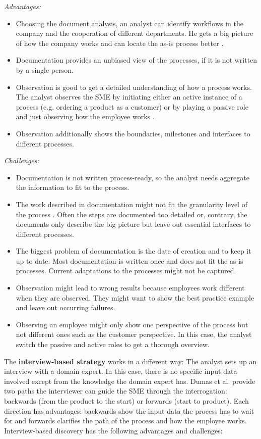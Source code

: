 \textit{Advantages:}
\begin{itemize}
\item Choosing the document analysis, an analyst can identify workflows in the company and the cooperation of different departments. He gets a big picture of how the company works and can locate the as-is process better \cite{Dumas2013}. 
\item Documentation provides an unbiased view of the processes, if it is not written by a single person. 
\item Observation is good to get a detailed understanding of how a process works. The analyst observes the SME by initiating either an active instance of a process (e.g. ordering a product as a customer) or by playing a passive role and just observing how the employee works \cite{Dumas2013}. 
\item Observation additionally shows the boundaries, milestones and interfaces to different processes.
\end{itemize}

\textit{Challenges:}
\begin{itemize}
\item Documentation is not written process-ready, so the analyst needs aggregate the information to fit to the process. 
\item The work described in documentation might not fit the granularity level of the process \cite{Dumas2013}. Often the steps are documented too detailed or, contrary, the documents only describe the big picture but leave out essential interfaces to different processes. 
\item The biggest problem of documentation is the date of creation and to keep it up to date: Most documentation is written once and does not fit the as-is processes. Current adaptations to the processes might not be captured. 
\item Observation might lead to wrong results because employees work different when they are observed. They might want to show the best practice example and leave out occurring failures. 
\item Observing an employee might only show one perspective of the process but not different ones such as the customer perspective. In this case, the analyst switch the passive and active roles to get a thorough overview. 
\end{itemize}

The \textbf{interview-based strategy} works in a different way: The analyst sets up an interview with a domain expert. In this case, there is no specific input data involved except from the knowledge the domain expert has. Dumas et al. provide two paths the interviewer can guide the SME through the interrogation: backwards (from the product to the start) or forwards (start to product). Each direction has advantages: backwards show the input data the process has to wait for and forwards clarifies the path of the process and how the employee works. \cite{Dumas2013} Interview-based discovery has the following advantages and challenges: 

